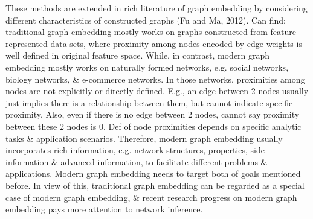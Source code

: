 \documentclass{article}
\begin{document}
\begin{itemize}
\begin{itemize}
        These methods are extended in rich literature of graph embedding by considering different characteristics of constructed graphs (Fu and Ma, 2012). Can find: traditional graph embedding mostly works on graphs constructed from feature represented data sets, where proximity among nodes encoded by edge weights is well defined in original feature space. While, in contrast, modern graph embedding mostly works on naturally formed networks, e.g. social networks, biology networks, \& e-commerce networks. In those networks, proximities among nodes are not explicitly or directly defined. E.g., an edge between 2 nodes usually just implies there is a relationship between them, but cannot indicate specific proximity. Also, even if there is no edge between 2 nodes, cannot say proximity between these 2 nodes is 0. Def of node proximities depends on specific analytic tasks \& application scenarios. Therefore, modern graph embedding usually incorporates rich information, e.g. network structures, properties, side information \& advanced information, to facilitate different problems \& applications. Modern graph embedding needs to target both of goals mentioned before. In view of this, traditional graph embedding can be regarded as a special case of modern graph embedding, \& recent research progress on modern graph embedding pays more attention to network inference.


\end{itemize}
\end{itemize}
\end{document}
